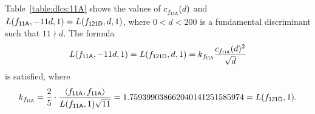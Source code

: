 Table~\ref{table:dlcs:11A} shows
the values of $c^{}_{f_\mathsf{{11A}}}(d)$
and $L(f_\mathsf{{11A}},-11d,1) = L(f_\mathsf{{121D}},d,1)$,
where $0<d<200$ is a fundamental discriminant
such that
$11\nmid d$.
The formula
\[
  L(f_\mathsf{{11A}},-11d,1) = L(f_\mathsf{{121D}},d,1)
  = k_{f_\mathsf{{11A}}} \frac{c_{f_\mathsf{{11A}}}(d)^2}{\sqrt{d}}
\]
is satisfied, where 
\[
  k_{\mf{11A}} = \frac{2}{5}\cdot
  \frac{\<\mf{11A},\mf{11A}>}
        {L(\mf{11A},1)\sqrt{11}}
  = 1.759399038662040141251585974  = L(\mf{121D},1).
\]
